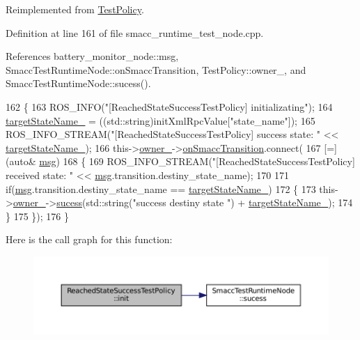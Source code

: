 Reimplemented from \hyperlink{classTestPolicy_a43d28339f108860503ef66ce4692596d}{Test\+Policy}.



Definition at line 161 of file smacc\+\_\+runtime\+\_\+test\+\_\+node.\+cpp.



References battery\+\_\+monitor\+\_\+node\+::msg, Smacc\+Test\+Runtime\+Node\+::on\+Smacc\+Transition, Test\+Policy\+::owner\+\_\+, and Smacc\+Test\+Runtime\+Node\+::sucess().


\begin{DoxyCode}
162   \{
163     ROS\_INFO(\textcolor{stringliteral}{"[ReachedStateSuccessTestPolicy] initializating"});
164     \hyperlink{classReachedStateSuccessTestPolicy_a2dc3e3fae4d136b61ca9499eebb06ba2}{targetStateName\_} = ((std::string)initXmlRpcValue[\textcolor{stringliteral}{"state\_name"}]);
165     ROS\_INFO\_STREAM(\textcolor{stringliteral}{"[ReachedStateSuccessTestPolicy] success state: "} << 
      \hyperlink{classReachedStateSuccessTestPolicy_a2dc3e3fae4d136b61ca9499eebb06ba2}{targetStateName\_});
166     this->\hyperlink{classTestPolicy_a717c3e59e35216a175398b85575aec43}{owner\_}->\hyperlink{classSmaccTestRuntimeNode_aaaedcb5c8a4cca432b5138bb1dfb0a6c}{onSmaccTransition}.connect(
167     [=](\textcolor{keyword}{auto}& \hyperlink{namespacebattery__monitor__node_ab1920c64448816edd4064e494275fdff}{msg})
168     \{
169         ROS\_INFO\_STREAM(\textcolor{stringliteral}{"[ReachedStateSuccessTestPolicy] received state: "} << 
      \hyperlink{namespacebattery__monitor__node_ab1920c64448816edd4064e494275fdff}{msg}.transition.destiny\_state\_name);
170 
171         \textcolor{keywordflow}{if}(\hyperlink{namespacebattery__monitor__node_ab1920c64448816edd4064e494275fdff}{msg}.transition.destiny\_state\_name == \hyperlink{classReachedStateSuccessTestPolicy_a2dc3e3fae4d136b61ca9499eebb06ba2}{targetStateName\_})
172         \{
173             this->\hyperlink{classTestPolicy_a717c3e59e35216a175398b85575aec43}{owner\_}->\hyperlink{classSmaccTestRuntimeNode_ae77d02680e11f7e128841b0ab9ed6e13}{sucess}(std::string(\textcolor{stringliteral}{"success destiny state "}) + 
      \hyperlink{classReachedStateSuccessTestPolicy_a2dc3e3fae4d136b61ca9499eebb06ba2}{targetStateName\_});
174         \}
175     \});
176   \}
\end{DoxyCode}
Here is the call graph for this function\+:
\nopagebreak
\begin{figure}[H]
\begin{center}
\leavevmode
\includegraphics[width=350pt]{classReachedStateSuccessTestPolicy_a2a3e598a103fcad64d7a6546c56a0fdd_cgraph}
\end{center}
\end{figure}
